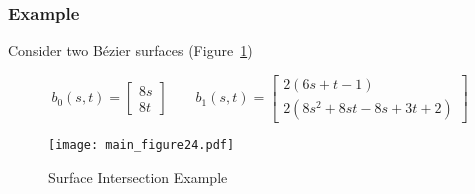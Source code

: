 \documentclass[letterpaper,10pt]{article}
\theoremstyle{definition}
\begin{document}
\subsubsection{Example}

Consider two B\'{e}zier surfaces
(Figure~\ref{fig:surface-surface-example})

\begin{equation}
b_0(s, t) =
\left[ \begin{array}{c}
    8 s \\ 8 t \end{array}\right] \qquad
b_1(s, t) =
\left[ \begin{array}{c}
    2 (6 s + t - 1) \\
    2 (8 s^2 + 8 s t - 8 s + 3 t + 2) \end{array}\right]
\end{equation}
\begin{figure}
  \texttt{[image: main\_figure24.pdf]}
  \centering
  \captionsetup{width=.75\linewidth}
  \caption{Surface Intersection Example}
  \label{fig:surface-surface-example}
\end{figure}
\end{document}
